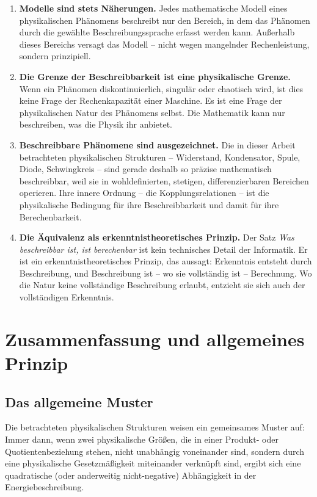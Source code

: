 ﻿\documentclass[12pt, a4paper]{article}
\begin{document}
	\begin{enumerate}
		\item \textbf{Modelle sind stets Näherungen.} Jedes mathematische Modell eines physikalischen Phänomens beschreibt nur den Bereich, in dem das Phänomen durch die gewählte Beschreibungssprache erfasst werden kann. Außerhalb dieses Bereichs versagt das Modell -- nicht wegen mangelnder Rechenleistung, sondern prinzipiell.
		\item \textbf{Die Grenze der Beschreibbarkeit ist eine physikalische Grenze.} Wenn ein Phänomen diskontinuierlich, singulär oder chaotisch wird, ist dies keine Frage der Rechenkapazität einer Maschine. Es ist eine Frage der physikalischen Natur des Phänomens selbst. Die Mathematik kann nur beschreiben, was die Physik ihr anbietet.
		\item \textbf{Beschreibbare Phänomene sind ausgezeichnet.} Die in dieser Arbeit betrachteten physikalischen Strukturen -- Widerstand, Kondensator, Spule, Diode, Schwingkreis -- sind gerade deshalb so präzise mathematisch beschreibbar, weil sie in wohldefinierten, stetigen, differenzierbaren Bereichen operieren. Ihre innere Ordnung -- die Kopplungsrelationen -- ist die physikalische Bedingung für ihre Beschreibbarkeit und damit für ihre Berechenbarkeit.
		\item \textbf{Die Äquivalenz als erkenntnistheoretisches Prinzip.} Der Satz \textit{Was beschreibbar ist, ist berechenbar} ist kein technisches Detail der Informatik. Er ist ein erkenntnistheoretisches Prinzip, das aussagt: Erkenntnis entsteht durch Beschreibung, und Beschreibung ist -- wo sie vollständig ist -- Berechnung. Wo die Natur keine vollständige Beschreibung erlaubt, entzieht sie sich auch der vollständigen Erkenntnis.
	\end{enumerate}

	\section{Zusammenfassung und allgemeines Prinzip}
	
	\subsection{Das allgemeine Muster}
	
	Die betrachteten physikalischen Strukturen weisen ein gemeinsames Muster auf: Immer dann, wenn zwei physikalische Größen, die in einer Produkt- oder Quotientenbeziehung stehen, nicht unabhängig voneinander sind, sondern durch eine physikalische Gesetzmäßigkeit miteinander verknüpft sind, ergibt sich eine quadratische (oder anderweitig nicht-negative) Abhängigkeit in der Energiebeschreibung.
	
\end{document}
